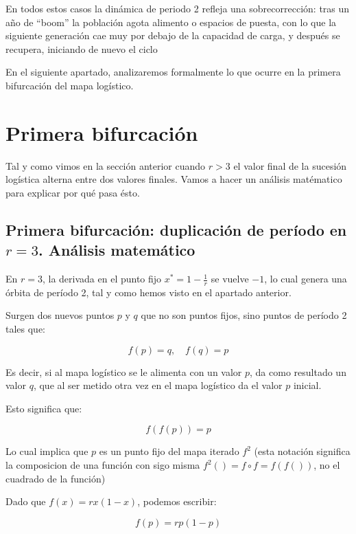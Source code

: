 \documentclass[
  11pt,
  a4paper,
  DIV=11,
  numbers=noendperiod]{scrreprt}
\begin{document}
En todos estos casos la dinámica de periodo 2 refleja una
sobrecorrección: tras un año de ``boom'' la población agota alimento o
espacios de puesta, con lo que la siguiente generación cae muy por
debajo de la capacidad de carga, y después se recupera, iniciando de
nuevo el ciclo

En el siguiente apartado, analizaremos formalmente lo que ocurre en la
primera bifurcación del mapa logístico.

\chapter{Primera bifurcación}\label{primera-bifurcaciuxf3n}

Tal y como vimos en la sección anterior cuando \(r > 3\) el valor final
de la sucesión logística alterna entre dos valores finales. Vamos a
hacer un análisis matématico para explicar por qué pasa ésto.

\section{\texorpdfstring{Primera bifurcación: duplicación de período en
\(r = 3\). Análisis
matemático}{Primera bifurcación: duplicación de período en r = 3. Análisis matemático}}\label{primera-bifurcaciuxf3n-duplicaciuxf3n-de-peruxedodo-en-r-3.-anuxe1lisis-matemuxe1tico}

En \(r = 3\), la derivada en el punto fijo \(x^* = 1 - \frac{1}{r}\) se
vuelve \(-1\), lo cual genera una órbita de período 2, tal y como hemos
visto en el apartado anterior.

Surgen dos nuevos puntos \(p\) y \(q\) que no son puntos fijos, sino
puntos de período 2 tales que:

\[
f(p) = q, \quad f(q) = p
\]

Es decir, si al mapa logístico se le alimenta con un valor \(p\), da
como resultado un valor \(q\), que al ser metido otra vez en el mapa
logístico da el valor \(p\) inicial.

Esto significa que:

\[
f(f(p)) = p
\]

Lo cual implica que \(p\) es un punto fijo del mapa iterado \(f^2\)
(esta notación significa la composicion de una función con sigo misma
\(f^2()=f \circ f = f(f())\), no el cuadrado de la función)

Dado que \(f(x) = r x (1 - x)\), podemos escribir:

\[
f(p) = r p (1 - p)
\]
\end{document}
